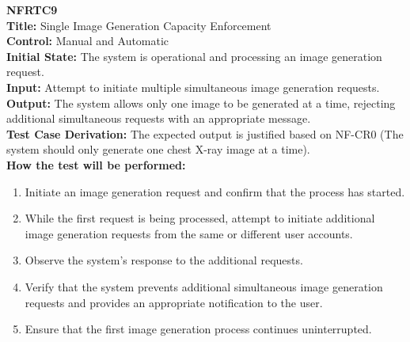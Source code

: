 \documentclass[12pt, titlepage]{article}
\begin{document}
\textbf{NFRTC9}\\
\textbf{Title:} Single Image Generation Capacity Enforcement\\
\textbf{Control:} Manual and Automatic\\
\textbf{Initial State:} The system is operational and processing an image generation request.\\
\textbf{Input:} Attempt to initiate multiple simultaneous image generation requests.\\
\textbf{Output:} The system allows only one image to be generated at a time, rejecting additional simultaneous requests with an appropriate message.\\
\textbf{Test Case Derivation:} The expected output is justified based on NF-CR0 (The system should only generate one chest X-ray image at a time).\\
\textbf{How the test will be performed:}
\begin{enumerate}
  \item Initiate an image generation request and confirm that the process has started.
  \item While the first request is being processed, attempt to initiate additional image generation requests from the same or different user accounts.
  \item Observe the system's response to the additional requests.
  \item Verify that the system prevents additional simultaneous image generation requests and provides an appropriate notification to the user.
  \item Ensure that the first image generation process continues uninterrupted.
\end{enumerate}
\vspace{1em}
\end{document}
